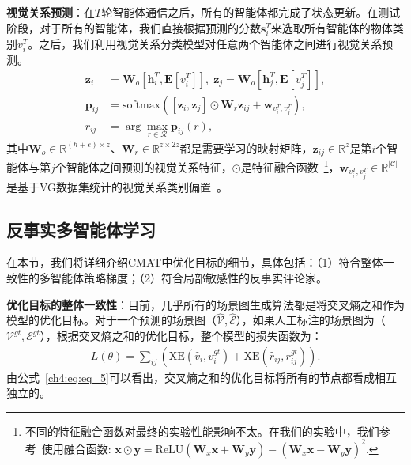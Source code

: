 \textbf{视觉关系预测}：在$T$轮智能体通信之后，所有的智能体都完成了状态更新。在测试阶段，对于所有的智能体，我们直接根据预测的分数$\bm{s}^T_i$来选取所有智能体的物体类别$v^T_i$。之后，我们利用视觉关系分类模型对任意两个智能体之间进行视觉关系预测。
\begin{equation}
\begin{aligned}
    \bm{z}_i & = \bm{W}_o [\bm{h}^T_i, \mathbf{E}[v^T_i]], \; \bm{z}_j = \bm{W}_o [\bm{h}^T_j, \mathbf{E}[v^T_j]], \\
    \bm{p}_{ij} & = \text{softmax} ([\bm{z}_i,  \bm{z}_j] \odot \bm{W}_r \bm{z}_{ij} + \bm{w}_{v^T_i, v^T_j}), \\
    r_{ij} & = \arg \textstyle{\max_{r \in \mathcal{R}}} \bm{p}_{ij}(r),
\end{aligned}
\end{equation}
其中$\bm{W}_o \in \mathbb{R}^{(h+e) \times z}$、$\bm{W}_r \in \mathbb{R}^{z\times 2z}$都是需要学习的映射矩阵，$\bm{z}_{ij} \in \mathbb{R}^z$是第$i$个智能体与第$j$个智能体之间预测的视觉关系特征，$\odot$是特征融合函数~\footnote{不同的特征融合函数对最终的实验性能影响不太。在我们的实验中，我们参考~\cite{zhang2018learning}使用融合函数: $\bm{x} \odot \bm{y} = \text{ReLU}(\bm{W}_x \bm{x} + \bm{W}_y \bm{y}) - (\bm{W}_x \bm{x} - \bm{W}_y \bm{y})^2$.}，$\bm{w}_{v^T_i, v^T_j} \in \mathbb{R}^{|\mathcal{C}|}$是基于VG数据集统计的视觉关系类别偏置~\cite{zellers2018neural}。 


\subsection{反事实多智能体学习}

在本节，我们将详细介绍CMAT中优化目标的细节，具体包括：（1）符合整体一致性的多智能体策略梯度；（2）符合局部敏感性的反事实评论家。


\textbf{优化目标的整体一致性}：目前，几乎所有的场景图生成算法都是将交叉熵之和作为模型的优化目标。对于一个预测的场景图（$\hat{\mathcal{V}}, \hat{\mathcal{E}}$），如果人工标注的场景图为（$\mathcal{V}^{gt}, \mathcal{E}^{gt}$），根据交叉熵之和的优化目标，整个模型的损失函数为：
\begin{equation} \label{ch4:eq:eq_5}
\begin{aligned}
   L(\theta) =  \textstyle{\sum_{ij}} \left(\text{XE}(\hat{v}_i, v^{gt}_i) + \text{XE}(\hat{r}_{ij}, r^{gt}_{ij}) \right). 
\end{aligned}
\end{equation}
由公式~\eqref{ch4:eq:eq_5}可以看出，交叉熵之和的优化目标将所有的节点都看成相互独立的。

